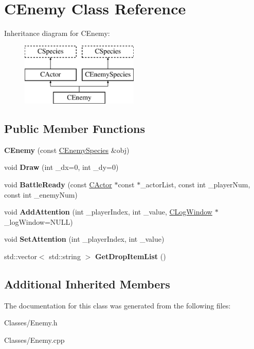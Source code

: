 \hypertarget{class_c_enemy}{}\section{C\+Enemy Class Reference}
\label{class_c_enemy}
Inheritance diagram for C\+Enemy\+:\begin{figure}[H]
\begin{center}
\leavevmode
\includegraphics[height=3.000000cm]{class_c_enemy}
\end{center}
\end{figure}
\subsection*{Public Member Functions}
\begin{DoxyCompactItemize}
\item 
{\bfseries C\+Enemy} (const \hyperlink{class_c_enemy_species}{C\+Enemy\+Species} \&obj)\hypertarget{class_c_enemy_ab5c28f8725327379dfe64dfebc68d2bf}{}\label{class_c_enemy_ab5c28f8725327379dfe64dfebc68d2bf}

\item 
void {\bfseries Draw} (int \+\_\+dx=0, int \+\_\+dy=0)\hypertarget{class_c_enemy_aedd3ed5bad987073bc186a773ffd2c28}{}\label{class_c_enemy_aedd3ed5bad987073bc186a773ffd2c28}

\item 
void {\bfseries Battle\+Ready} (const \hyperlink{class_c_actor}{C\+Actor} $\ast$const $\ast$\+\_\+actor\+List, const int \+\_\+player\+Num, const int \+\_\+enemy\+Num)\hypertarget{class_c_enemy_a5e5f02fa87856b02da52805683fe2678}{}\label{class_c_enemy_a5e5f02fa87856b02da52805683fe2678}

\item 
void {\bfseries Add\+Attention} (int \+\_\+player\+Index, int \+\_\+value, \hyperlink{class_c_log_window}{C\+Log\+Window} $\ast$\+\_\+log\+Window=N\+U\+LL)\hypertarget{class_c_enemy_a34e14d379c133bec19a6f7ec31647a6b}{}\label{class_c_enemy_a34e14d379c133bec19a6f7ec31647a6b}

\item 
void {\bfseries Set\+Attention} (int \+\_\+player\+Index, int \+\_\+value)\hypertarget{class_c_enemy_a0ae40dfe0d249f6644fcaf3bfd89160c}{}\label{class_c_enemy_a0ae40dfe0d249f6644fcaf3bfd89160c}

\item 
std\+::vector$<$ std\+::string $>$ {\bfseries Get\+Drop\+Item\+List} ()\hypertarget{class_c_enemy_afe06e412b937daf27fcc21ee2d68a4f2}{}\label{class_c_enemy_afe06e412b937daf27fcc21ee2d68a4f2}

\end{DoxyCompactItemize}
\subsection*{Additional Inherited Members}


The documentation for this class was generated from the following files\+:\begin{DoxyCompactItemize}
\item 
Classes/Enemy.\+h\item 
Classes/Enemy.\+cpp\end{DoxyCompactItemize}
